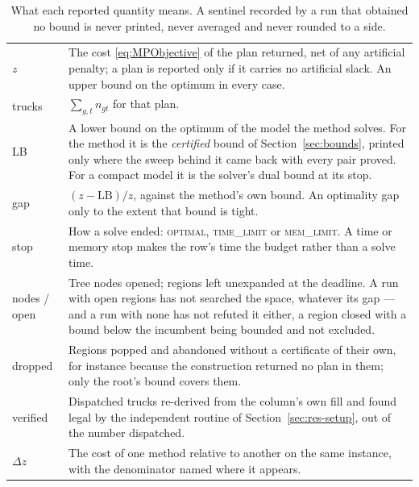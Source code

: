 \begin{table}[!htbp]
\centering
\small
\caption{What each reported quantity means. A sentinel recorded by a
run that obtained no bound is never printed, never averaged and never
rounded to a side.}
\label{tab:quantities}
\begin{tabular}{@{}lp{}@{}}
\toprule
$z$ & The cost \eqref{eq:MPObjective} of the plan returned, net of any
  artificial penalty; a plan is reported only if it carries no
  artificial slack. An upper bound on the optimum in every case. \\
trucks & $\sum_{g,t}n_{gt}$ for that plan. \\
LB & A lower bound on the optimum of the model the method solves. For
  the method it is the \emph{certified} bound of
  Section~\ref{sec:bounds}, printed only where the sweep behind it came
  back with every pair proved. For a compact model it is the
  solver's dual bound at its stop. \\
gap & $(z-\mathrm{LB})/z$, against the method's own bound. An
  optimality gap only to the extent that bound is tight. \\
stop & How a solve ended: \textsc{optimal}, \textsc{time\_limit} or
  \textsc{mem\_limit}. A time or memory stop makes the row's time the
  budget rather than a solve time. \\
nodes / open & Tree nodes opened; regions left unexpanded at the
  deadline. A run with open regions has not searched the space,
  whatever its gap --- and a run with none has not refuted it either,
  a region closed with a bound below the incumbent being bounded and
  not excluded. \\
dropped & Regions popped and abandoned without a certificate of their
  own, for instance because the construction returned no plan in them;
  only the root's bound covers them. \\
verified & Dispatched trucks re-derived from the column's own fill and
  found legal by the independent routine of
  Section~\ref{sec:res-setup}, out of the number dispatched. \\
$\Delta z$ & The cost of one method relative to another on the same
  instance, with the denominator named where it appears. \\
\bottomrule
\end{tabular}
\end{table}
